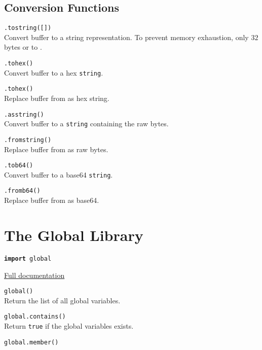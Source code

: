 \subsection*{Conversion Functions}

\hangpar {}\texttt{.tostring([}\texttt{])}\\
Convert  buffer to a string representation. To prevent memory exhaustion, only $32$ bytes or to .

\hangpar {}\texttt{.tohex()}\\
Convert  buffer to a hex \texttt{string}.

\hangpar {}\texttt{.tohex(}\texttt{)}\\
Replace  buffer from  as hex string.

\hangpar {}\texttt{.asstring()}\\
Convert  buffer to a \texttt{string} containing the raw bytes.

\hangpar {}\texttt{.fromstring(}\texttt{)}\\
Replace  buffer from  as raw bytes.

\hangpar {}\texttt{.tob64()}\\
Convert  buffer to a base64 \texttt{string}.

\hangpar {}\texttt{.fromb64(}\texttt{)}\\
Replace  buffer from  as base64.

\section*{The Global Library}

\hangpar \texttt{\textbf{import} global}

\hangpar \href{https://github.com/berry-lang/berry/wiki/Chapter-7\#module-global}{Full documentation}

\hangpar \texttt{global()}\\
Return the list of all global variables.

\hangpar \texttt{global.contains(}\texttt{)} \\
Return \texttt{true} if the global variables exists.

\hangpar \texttt{global.member(}\texttt{)}

